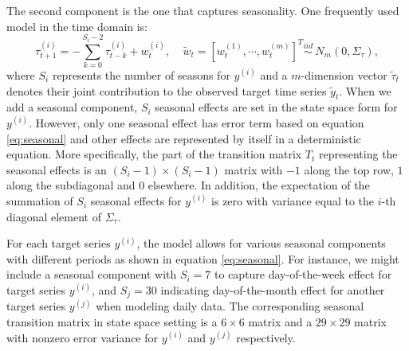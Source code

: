 \documentclass[twoside,11pt]{article}
\begin{document}
The second component is the one that captures seasonality. One frequently used model in the time domain is:
\begin{equation} \label{eq:seasonal}
\tau_{t+1}^{(i)}=-\sum_{k=0}^{S_i-2}\tau^{(i)}_{t-k}+w^{(i)}_t,  \ \ \  \ \ \tilde{w}_t=[w^{(1)}_t,\cdots,w^{(m)}_t]^T\stackrel{iid}\sim  \ N_m(0,\Sigma_\tau),
\end{equation}
where $S_i$ represents the number of seasons for $y^{(i)}$ and a $m$-dimension vector $\tilde{\tau}_t$
denotes their joint contribution to the observed target time series $\tilde{y}_t$.
When we add a seasonal component, $S_i$ seasonal effects are set in the state space form for $y^{(i)}$. However, only one seasonal effect has error term based on equation \eqref{eq:seasonal} and other effects are represented by itself in a deterministic equation. More specifically, the part of the transition matrix $T_t$ representing the seasonal effects is an $(S_i-1)\times (S_i-1)$ matrix with $-1$ along the top row, $1$ along the subdiagonal and $0$ elsewhere.
In addition, the expectation of the summation of $S_i$ seasonal effects for $y^{(i)}$ is zero with variance equal to the $i$-th diagonal element of $\Sigma_\tau$.

For each target series $y^{(i)}$, the model allows for various seasonal components with different periods as shown in equation \eqref{eq:seasonal}.
For instance, we might include a seasonal component with $S_i=7$ to capture day-of-the-week effect for target series $y^{(i)}$, and $S_j=30$ indicating day-of-the-month effect for another target series $y^{(j)}$ when modeling daily data. The corresponding seasonal transition matrix in state space setting is a $6\times6$ matrix and a $29\times 29$ matrix with nonzero error variance for $y^{(i)}$ and $y^{(j)}$ respectively.
\end{document}
